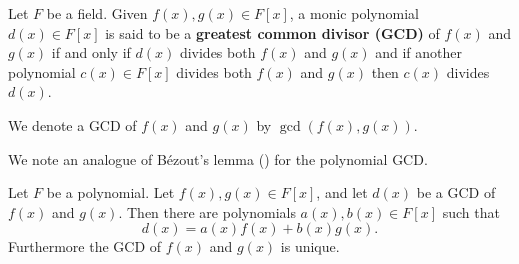 \newpage

\begin{definition}
    Let $F$ be a field. Given $f(x), g(x) \in F[x]$, a monic polynomial $d(x) \in F[x]$ is said to be a \textbf{greatest common divisor (GCD)} of $f(x)$ and $g(x)$ if and only if $d(x)$ divides both $f(x)$ and $g(x)$ and if another polynomial $c(x) \in F[x]$ divides both $f(x)$ and $g(x)$ then $c(x)$ divides $d(x)$.

    We denote a GCD of $f(x)$ and $g(x)$ by $\gcd(f(x), g(x))$.
\end{definition}

We note an analogue of B\'ezout's lemma () for the polynomial GCD.

\begin{theorem}\label{thrm-bezout-lemma-for-polynomials}
    Let $F$ be a polynomial. Let $f(x), g(x) \in F[x]$, and let $d(x)$ be a GCD of $f(x)$ and $g(x)$. Then there are polynomials $a(x), b(x) \in F[x]$ such that
    \[
        d(x) = a(x)f(x) + b(x)g(x).
    \]
    Furthermore the GCD of $f(x)$ and $g(x)$ is unique.
\end{theorem}
